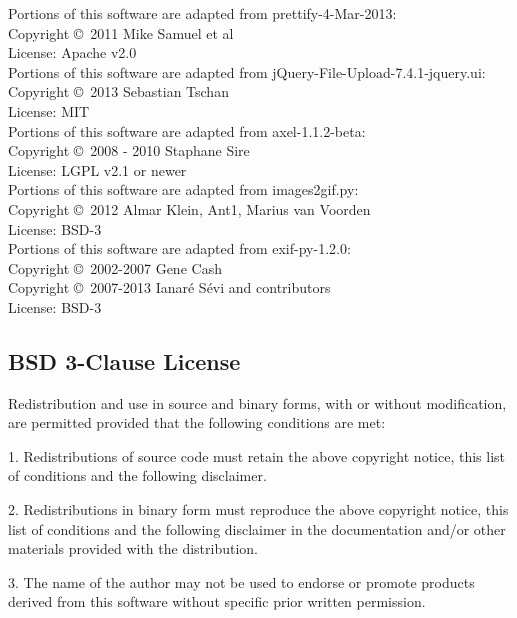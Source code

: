 \documentclass[10pt]{article}
\begin{document}
\noindent Portions of this software are adapted from prettify-4-Mar-2013: \\
Copyright \copyright\ 2011 Mike Samuel et al \\
License: Apache v2.0 \\

\noindent Portions of this software are adapted from jQuery-File-Upload-7.4.1-jquery.ui: \\
Copyright \copyright\ 2013 Sebastian Tschan \\
License: MIT \\

\noindent Portions of this software are adapted from axel-1.1.2-beta: \\
Copyright \copyright\ 2008 - 2010 Staphane Sire \\
License: LGPL v2.1 or newer \\

\noindent Portions of this software are adapted from images2gif.py: \\
Copyright \copyright\ 2012 Almar Klein, Ant1, Marius van Voorden \\
License: BSD-3 \\

\noindent Portions of this software are adapted from exif-py-1.2.0: \\
Copyright \copyright\ 2002-2007 Gene Cash \\
Copyright \copyright\ 2007-2013 Ianaré Sévi and contributors \\
License: BSD-3 \\


\clearpage
\subsection{BSD 3-Clause License}
Redistribution and use in source and binary forms, with or without
modification, are permitted provided that the following conditions
are met:

1. Redistributions of source code must retain the above copyright
   notice, this list of conditions and the following disclaimer.

2. Redistributions in binary form must reproduce the above copyright
   notice, this list of conditions and the following disclaimer in the
   documentation and/or other materials provided with the distribution.

3. The name of the author may not be used to endorse or promote products
   derived from this software without specific prior written permission.
\end{document}
